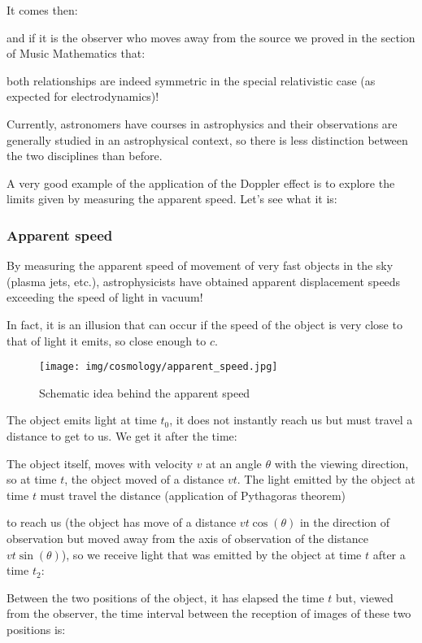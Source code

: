 	It comes then:
	
	and if it is the observer who moves away from the source we proved in the section of Music Mathematics that:
	
	both relationships are indeed symmetric in the special relativistic case (as expected for electrodynamics)!
	\begin{tcolorbox}[title=Remark,colframe=black,arc=10pt]
	Currently, astronomers have courses in astrophysics and their observations are generally studied in an astrophysical context, so there is less distinction between the two disciplines than before.
	\end{tcolorbox}
	A very good example of the application of the Doppler effect is to explore the limits given by measuring the apparent speed. Let's see what it is:
	
	\subsubsection{Apparent speed}
	By measuring the apparent speed of movement of very fast objects in the sky (plasma jets, etc.), astrophysicists have obtained apparent displacement speeds exceeding the speed of light in vacuum!

	In fact, it is an illusion that can occur if the speed of the object is very close to that of light it emits, so close enough to $c$.
	\begin{figure}[H]
		\centering
		\texttt{[image: img/cosmology/apparent\_speed.jpg]}
		\caption{Schematic idea behind the apparent speed}
	\end{figure}
	The object emits light at time $t_0$, it does not instantly reach us but must travel a distance to get to us. We get it after the time:
	
	The object itself, moves with velocity $v$ at an angle $\theta$ with the viewing direction, so at time $t$, the object moved of a distance $vt$. The light emitted by the object at time $t$ must travel the distance (application of Pythagoras theorem)
	
	to reach us (the object has move of a distance $vt\cos(\theta)$ in the direction of observation but moved away from the axis of observation of the distance $vt\sin(\theta)$), so we receive light that was emitted by the object at time $t$ after a time $t_2$:
	
	Between the two positions of the object, it has elapsed the time $t$ but, viewed from the observer, the time interval between the reception of images of these two positions is:
	
